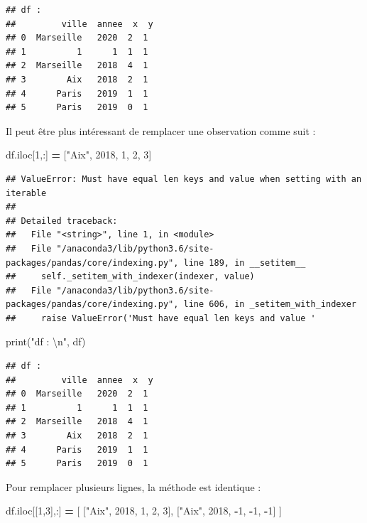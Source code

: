 \documentclass[12pt,]{book}
\newenvironment{Shaded}{\begin{snugshade}}{\end{snugshade}}
\newcommand{\DecValTok}[1]{\textcolor[rgb]{0.00,0.00,0.81}{#1}}
\newcommand{\CharTok}[1]{\textcolor[rgb]{0.31,0.60,0.02}{#1}}
\newcommand{\StringTok}[1]{\textcolor[rgb]{0.31,0.60,0.02}{#1}}
\newcommand{\OperatorTok}[1]{\textcolor[rgb]{0.81,0.36,0.00}{\textbf{#1}}}
\newcommand{\BuiltInTok}[1]{#1}
\newcommand{\NormalTok}[1]{#1}
\numberwithin{equation}{section}
\numberwithin{countremarque}{section}
\begin{document}
\begin{lstlisting}
## df : 
##         ville  annee  x  y
## 0  Marseille   2020  2  1
## 1          1      1  1  1
## 2  Marseille   2018  4  1
## 3        Aix   2018  2  1
## 4      Paris   2019  1  1
## 5      Paris   2019  0  1
\end{lstlisting}

Il peut être plus intéressant de remplacer une observation comme suit :

\begin{Shaded}
\begin{Highlighting}[]
\NormalTok{df.iloc[}\DecValTok{1}\NormalTok{,:] }\OperatorTok{=}\NormalTok{ [}\StringTok{"Aix"}\NormalTok{, }\DecValTok{2018}\NormalTok{, }\DecValTok{1}\NormalTok{, }\DecValTok{2}\NormalTok{, }\DecValTok{3}\NormalTok{]}
\end{Highlighting}
\end{Shaded}

\begin{lstlisting}
## ValueError: Must have equal len keys and value when setting with an iterable
## 
## Detailed traceback: 
##   File "<string>", line 1, in <module>
##   File "/anaconda3/lib/python3.6/site-packages/pandas/core/indexing.py", line 189, in __setitem__
##     self._setitem_with_indexer(indexer, value)
##   File "/anaconda3/lib/python3.6/site-packages/pandas/core/indexing.py", line 606, in _setitem_with_indexer
##     raise ValueError('Must have equal len keys and value '
\end{lstlisting}

\begin{Shaded}
\begin{Highlighting}[]
\BuiltInTok{print}\NormalTok{(}\StringTok{"df : }\CharTok{\textbackslash{}n}\StringTok{"}\NormalTok{, df)}
\end{Highlighting}
\end{Shaded}

\begin{lstlisting}
## df : 
##         ville  annee  x  y
## 0  Marseille   2020  2  1
## 1          1      1  1  1
## 2  Marseille   2018  4  1
## 3        Aix   2018  2  1
## 4      Paris   2019  1  1
## 5      Paris   2019  0  1
\end{lstlisting}

Pour remplacer plusieurs lignes, la méthode est identique :

\begin{Shaded}
\begin{Highlighting}[]
\NormalTok{df.iloc[[}\DecValTok{1}\NormalTok{,}\DecValTok{3}\NormalTok{],:] }\OperatorTok{=}\NormalTok{ [}
\NormalTok{    [}\StringTok{"Aix"}\NormalTok{, }\DecValTok{2018}\NormalTok{, }\DecValTok{1}\NormalTok{, }\DecValTok{2}\NormalTok{, }\DecValTok{3}\NormalTok{],}
\NormalTok{    [}\StringTok{"Aix"}\NormalTok{, }\DecValTok{2018}\NormalTok{, }\OperatorTok{-}\DecValTok{1}\NormalTok{, }\OperatorTok{-}\DecValTok{1}\NormalTok{, }\OperatorTok{-}\DecValTok{1}\NormalTok{]}
\NormalTok{]}
\end{Highlighting}
\end{Shaded}
\end{document}
